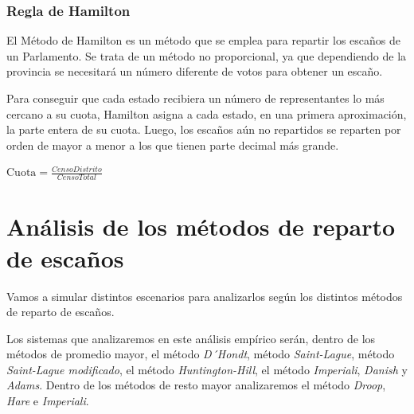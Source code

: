 \documentclass[12pt,a4paper,]{book}
\def\ifdoblecara{} %
\def\ifprincipal{} %
\numberwithin{dummy}{section}
\theoremstyle{ocrenumbox}
\theoremstyle{blacknumex}
\theoremstyle{blacknumbox}
\theoremstyle{ocrenum}
\theoremstyle{ocrenum}
\begin{document}
\hypertarget{regla-de-hamilton}{%
\subsection{Regla de Hamilton}\label{regla-de-hamilton}}

El Método de Hamilton es un método que se emplea para repartir los
escaños de un Parlamento. Se trata de un método no proporcional, ya que
dependiendo de la provincia se necesitará un número diferente de votos
para obtener un escaño.

Para conseguir que cada estado recibiera un número de representantes lo
más cercano a su cuota, Hamilton asigna a cada estado, en una primera
aproximación, la parte entera de su cuota. Luego, los escaños aún no
repartidos se reparten por orden de mayor a menor a los que tienen parte
decimal más grande.

\(\textrm{Cuota} = \frac{Censo Distrito}{Censo Total}\)

\FloatBarrier

\ifdefined\ifprincipal
\else
\setlength{\parindent}{1em}
\pagestyle{fancy}
\setcounter{tocdepth}{4}
\tableofcontents

\fi

\ifdefined\ifdoblecara
\fancyhead{}{}
\fancyhead[LE,RO]{\scriptsize\rightmark}
\fancyfoot[LO,RE]{\scriptsize\slshape \leftmark}
\fancyfoot[C]{}
\fancyfoot[LE,RO]{\footnotesize\thepage}
\else
\fancyhead{}{}
\fancyhead[RO]{\scriptsize\rightmark}
\fancyfoot[LO]{\scriptsize\slshape \leftmark}
\fancyfoot[C]{}
\fancyfoot[RO]{\footnotesize\thepage}
\fi
\renewcommand{\headrulewidth}{0.4pt}
\renewcommand{\footrulewidth}{0.4pt}

\hypertarget{anuxe1lisis-de-los-muxe9todos-de-reparto-de-escauxf1os}{%
\chapter{Análisis de los métodos de reparto de
escaños}\label{anuxe1lisis-de-los-muxe9todos-de-reparto-de-escauxf1os}}

Vamos a simular distintos escenarios para analizarlos según los
distintos métodos de reparto de escaños.

Los sistemas que analizaremos en este análisis empírico serán, dentro de
los métodos de promedio mayor, el método \emph{D´Hondt}, método
\emph{Saint-Lague}, método \emph{Saint-Lague modificado}, el método
\emph{Huntington-Hill}, el método \emph{Imperiali}, \emph{Danish} y
\emph{Adams}. Dentro de los métodos de resto mayor analizaremos el
método \emph{Droop}, \emph{Hare} e \emph{Imperiali}.
\end{document}

